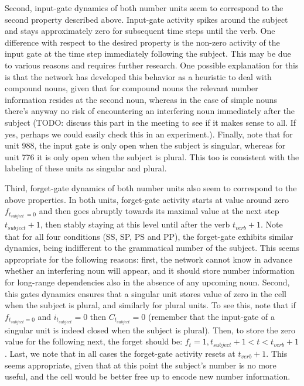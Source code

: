 Second, input-gate dynamics of both number units seem to correspond to the second property described above. Input-gate activity spikes around the subject and stays approximately zero for subsequent time steps until the verb. One difference with respect to the desired property is the non-zero activity of the input gate at the time step immediately following the subject. This may be due to various reasons and requires further research. One possible explanation for this is that the network has developed this behavior as a heuristic to deal with compound nouns, given that for compound nouns the relevant number information resides at the second noun, whereas in the case of simple nouns there's anyway no risk of encountering an interfering noun immediately after the subject (TODO: discuss this part in the meeting to see if it makes sense to all. If yes, perhaps we could easily check this in an experiment.). Finally, note that for unit 988, the input gate is only open when the subject is singular, whereas for unit 776 it is only open when the subject is plural. This too is consistent with the labeling of these units as singular and plural.

Third, forget-gate dynamics of both number units also seem to correspond to the above properties. In both units, forget-gate activity starts at value around zero $f_{t_{subject}~=0}$ and then goes abruptly towards its maximal value at the next step $t_{subject}+1$, then stably staying at this level until after the verb $t_{verb}+1$. Note that for all four conditions (SS, SP, PS and PP), the forget-gate exhibits similar dynamics, being indifferent to the grammatical number of the subject. This seems appropriate for the following reasons: first, the network cannot know in advance whether an interfering noun will appear, and it should store number information for long-range dependencies also in the absence of any upcoming noun. Second, this gates dynamics ensures that a singular unit stores value of zero in the cell when the subject is plural, and similarly for plural units. To see this, note that if $f_{t_{subject}=0}$ and $i_{t_{subject}}=0$ then $C_{t_{subject}}=0$ (remember that the input-gate of a singular unit is indeed closed when the subject is plural). Then, to store the zero value for the following next, the forget should be: $f_t = 1, t_{subject}+1<t<t_{verb}+1$. Last, we note that in all cases the forget-gate activity resets at $t_{verb}+1$. This seems appropriate, given that at this point the subject's number is no more useful, and the cell would be better free up to encode new number information.
 
